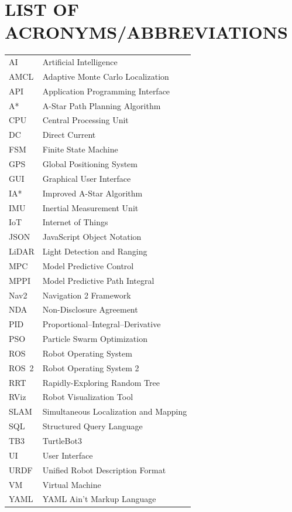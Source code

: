 \documentclass[12pt,a4paper]{report}
\begin{document}
	\listoffigures
	\clearpage
	
	\listoftables
	\clearpage
	
	\chapter*{LIST OF ACRONYMS/ABBREVIATIONS}
	\thispagestyle{plain}
\begin{longtable}{p{3.5cm} p{10cm}}
	AI      & Artificial Intelligence \\
	AMCL    & Adaptive Monte Carlo Localization \\
	API     & Application Programming Interface \\
	A*      & A-Star Path Planning Algorithm \\
	CPU     & Central Processing Unit \\
	DC      & Direct Current \\
	FSM     & Finite State Machine \\
	GPS     & Global Positioning System \\
	GUI     & Graphical User Interface \\
	IA*     & Improved A-Star Algorithm \\
	IMU     & Inertial Measurement Unit \\
	IoT     & Internet of Things \\
	JSON    & JavaScript Object Notation \\
	LiDAR   & Light Detection and Ranging \\
	MPC     & Model Predictive Control \\
	MPPI    & Model Predictive Path Integral \\
	Nav2    & Navigation 2 Framework \\
	NDA     & Non-Disclosure Agreement \\
	PID     & Proportional--Integral--Derivative \\
	PSO     & Particle Swarm Optimization \\
	ROS     & Robot Operating System \\
	ROS~2   & Robot Operating System 2 \\
	RRT     & Rapidly-Exploring Random Tree \\
	RViz    & Robot Visualization Tool \\
	SLAM    & Simultaneous Localization and Mapping \\
	SQL     & Structured Query Language \\
	TB3     & TurtleBot3 \\
	UI      & User Interface \\
	URDF    & Unified Robot Description Format \\
	VM      & Virtual Machine \\
	YAML    & YAML Ain't Markup Language \\
\end{longtable}
	\clearpage
	
\end{document}
